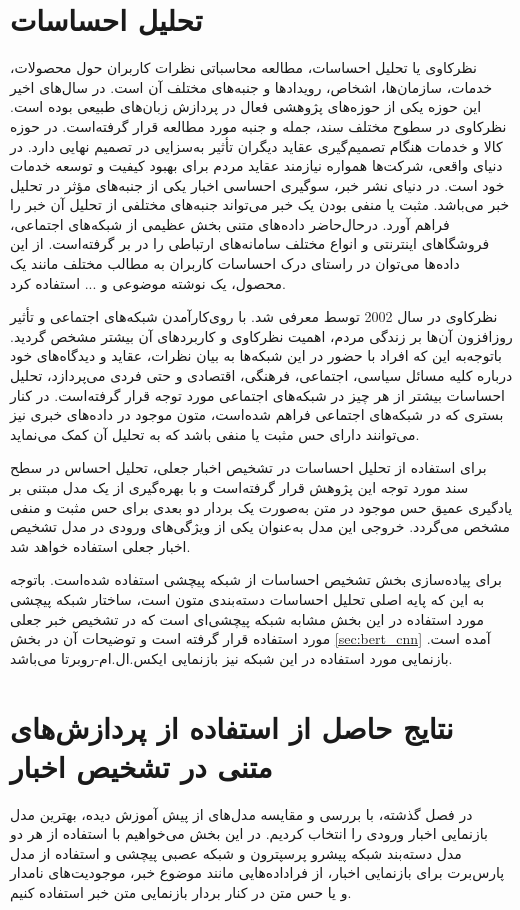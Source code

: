 \section{تحلیل احساسات}
نظرکاوی یا تحلیل احساسات، مطالعه محاسباتی نظرات کاربران حول محصولات، خدمات، سازمان‌ها، اشخاص، رویدادها و جنبه‌های مختلف آن است. در سال‌های اخیر این حوزه یکی از حوزه‌های پژوهشی فعال در پردازش زبان‌های طبیعی بوده است. نظرکاوی در سطوح مختلف سند، جمله و جنبه مورد مطالعه قرار گرفته‌است. در حوزه کالا و خدمات هنگام تصمیم‌گیری عقاید دیگران تأثیر به‌سزایی در تصمیم نهایی دارد. در دنیای واقعی، شرکت‌ها همواره نیازمند عقاید مردم برای بهبود کیفیت و توسعه خدمات خود است. در دنیای نشر خبر، سوگیری احساسی اخبار یکی از جنبه‌های مؤثر در تحلیل خبر می‌باشد. مثبت یا منفی بودن یک خبر می‌تواند جنبه‌های مختلفی از تحلیل آن خبر را فراهم آورد. درحال‌حاضر داده‌های متنی  بخش عظیمی از شبکه‌های اجتماعی، فروشگاهای اینترنتی و انواع مختلف سامانه‌های ارتباطی را در بر گرفته‌است. از این داده‌ها می‌توان در راستای درک احساسات کاربران به مطالب مختلف مانند یک محصول، یک نوشته موضوعی و ... استفاده کرد. 

نظر‌کاوی در سال 2002 توسط \citet{pang2002} معرفی شد. با روی‌کارآمدن شبکه‌های اجتماعی و تأثیر روزافزون آن‌ها بر زندگی مردم، اهمیت نظر‌کاوی و کاربردهای آن بیشتر مشخص گردید. باتوجه‌به این که افراد با حضور در این شبکه‌ها به بیان نظرات، عقاید و دیدگاه‌های خود درباره کلیه مسائل سیاسی، اجتماعی، فرهنگی، اقتصادی و حتی فردی می‌پردازد، تحلیل احساسات بیشتر از هر چیز در شبکه‌های اجتماعی مورد توجه قرار گرفته‌است. در کنار بستری که در شبکه‌های اجتماعی فراهم شده‌است، متون موجود در داده‌های خبری نیز می‌توانند دارای حس مثبت یا منفی باشد که به تحلیل آن کمک می‌نماید.

برای استفاده از تحلیل احساسات در تشخیص اخبار جعلی، تحلیل احساس در سطح سند مورد توجه این پژوهش قرار گرفته‌است و با بهره‌گیری از یک مدل مبتنی‌ بر یادگیری عمیق حس موجود در متن به‌صورت یک بردار دو بعدی برای حس مثبت و منفی مشخص می‌گردد. خروجی این مدل به‌عنوان یکی از ویژگی‌های ورودی در مدل تشخیص اخبار جعلی استفاده خواهد شد.

برای پیاده‌سازی بخش تشخیص احساسات از شبکه پیچشی استفاده شده‌است. باتوجه‌ به این که پایه اصلی تحلیل احساسات دسته‌بندی متون است، ساختار شبکه پیچشی مورد استفاده در این بخش مشابه شبکه پیچشی‌ای است که در تشخیص خبر جعلی مورد استفاده قرار گرفته‌ است و توضیحات آن در بخش \ref{sec:bert_cnn} آمده ‌است.  بازنمایی مورد استفاده در این شبکه نیز بازنمایی ایکس.ال.ام-روبرتا می‌باشد.

\section{نتایج حاصل از استفاده از پردازش‌های متنی در تشخیص اخبار}
در فصل گذشته، با بررسی و مقایسه مدل‌های از پیش آموزش دیده، بهترین مدل بازنمایی اخبار ورودی را انتخاب کردیم. در این بخش می‌خواهیم با استفاده از هر دو مدل دسته‌بند شبکه پیشرو پرسپترون و شبکه عصبی پیچشی و استفاده از مدل پارس‌برت برای بازنمایی اخبار، از فراداده‌هایی مانند موضوع خبر، موجودیت‌های نامدار و یا حس متن در کنار بردار بازنمایی متن خبر استفاده کنیم.

